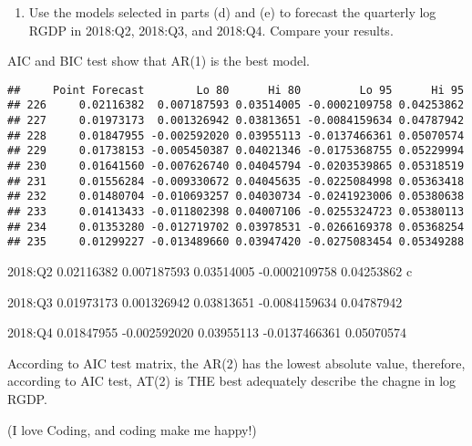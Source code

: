 \documentclass[
]{article}
\newenvironment{Shaded}{\begin{snugshade}}{\end{snugshade}}
\newcommand{\AttributeTok}[1]{\textcolor[rgb]{0.77,0.63,0.00}{#1}}
\newcommand{\ConstantTok}[1]{\textcolor[rgb]{0.00,0.00,0.00}{#1}}
\newcommand{\DecValTok}[1]{\textcolor[rgb]{0.00,0.00,0.81}{#1}}
\newcommand{\FunctionTok}[1]{\textcolor[rgb]{0.00,0.00,0.00}{#1}}
\newcommand{\NormalTok}[1]{#1}
\newcommand{\OtherTok}[1]{\textcolor[rgb]{0.56,0.35,0.01}{#1}}
\newcommand{\SpecialCharTok}[1]{\textcolor[rgb]{0.00,0.00,0.00}{#1}}
\providecommand{\tightlist}{%
  \setlength{\itemsep}{0pt}\setlength{\parskip}{0pt}}
\begin{document}
\begin{enumerate}
\def\labelenumi{\alph{enumi}.}
\setcounter{enumi}{5}
\tightlist
\item
  Use the models selected in parts (d) and (e) to forecast the quarterly
  log RGDP in 2018:Q2, 2018:Q3, and 2018:Q4. Compare your results.
\end{enumerate}

AIC and BIC test show that AR(1) is the best model.

\begin{Shaded}
\end{Shaded}

\begin{verbatim}
##     Point Forecast        Lo 80      Hi 80         Lo 95      Hi 95
## 226     0.02116382  0.007187593 0.03514005 -0.0002109758 0.04253862
## 227     0.01973173  0.001326942 0.03813651 -0.0084159634 0.04787942
## 228     0.01847955 -0.002592020 0.03955113 -0.0137466361 0.05070574
## 229     0.01738153 -0.005450387 0.04021346 -0.0175368755 0.05229994
## 230     0.01641560 -0.007626740 0.04045794 -0.0203539865 0.05318519
## 231     0.01556284 -0.009330672 0.04045635 -0.0225084998 0.05363418
## 232     0.01480704 -0.010693257 0.04030734 -0.0241923006 0.05380638
## 233     0.01413433 -0.011802398 0.04007106 -0.0255324723 0.05380113
## 234     0.01353280 -0.012719702 0.03978531 -0.0266169378 0.05368254
## 235     0.01299227 -0.013489660 0.03947420 -0.0275083454 0.05349288
\end{verbatim}

2018:Q2 0.02116382 0.007187593 0.03514005 -0.0002109758 0.04253862 c

2018:Q3 0.01973173 0.001326942 0.03813651 -0.0084159634 0.04787942

2018:Q4 0.01847955 -0.002592020 0.03955113 -0.0137466361 0.05070574

According to AIC test matrix, the AR(2) has the lowest absolute value,
therefore, according to AIC test, AT(2) is THE best adequately describe
the chagne in log RGDP.

(I love Coding, and coding make me happy!)
\end{document}
